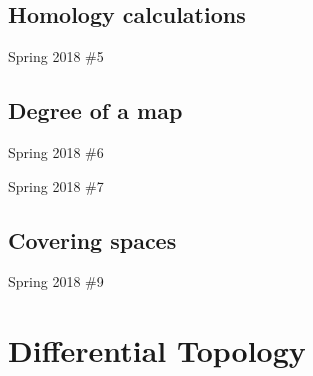 \documentclass{amsart}
\begin{document}
\subsection{Homology calculations}
\begin{todolist}
	\item Spring 2018 \#5
\end{todolist}

\subsection{Degree of a map}
\begin{todolist}
	\item Spring 2018 \#6
	\item Spring 2018 \#7
\end{todolist}

\subsection{Covering spaces}
\begin{todolist}
	\item Spring 2018 \#9
\end{todolist}

\section{Differential Topology}

\subsection{}
\subsection{}
\end{document}
